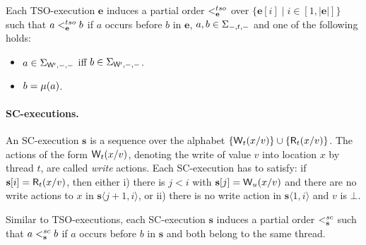 Each TSO-execution $\mathbf{e}$ induces a partial order $<^{tso}_{\mathbf{e}}$ over $\{\mathbf{e}[i] \mid i\in[1,|\mathbf{e}|]\}$ such that $a<^{tso}_{\mathbf{e}} b$ if $a$ occurs before $b$ in $\mathbf{e}$, $a,b\in\Sigma_{-,t,-}$ and one of the following holds:
\begin{itemize}
\item $a\in\Sigma_{\mathsf{W}^{\mathsf{r}},-,-}$ iff $b\in\Sigma_{\mathsf{W}^{\mathsf{r}},-,-}$.
\item $b=\mu(a)$.
\end{itemize}

\paragraph{SC-executions.}
An SC-execution $\mathbf{s}$ is a sequence over the alphabet $\{\mathsf{W}_{t}(x/v)\}\cup\{\mathsf{R}_{t}(x/v)\}$.
The actions of the form $\mathsf{W}_{t}(x/v)$, denoting the write of value $v$ into location $x$ by thread $t$, are called {\em write} actions.
Each SC-execution has to satisfy: if $\mathbf{s}[i]=\mathsf{R}_{t}(x/v)$, then either i) there is $j<i$ with $\mathbf{s}[j]=\mathsf{W}_{u}(x/v)$ and there are no write actions to $x$ in $\mathbf{s}\langle j+1,i\rangle$, or ii) there is no write action in $\mathbf{s}\langle 1,i\rangle$ and $v$ is $\bot$.

Similar to TSO-executions, each SC-execution $\mathbf{s}$ induces a partial order $<^{sc}_{\mathbf{s}}$ such that $a<^{sc}_{\mathbf{s}} b$ if $a$ occurs before $b$ in $\mathbf{s}$ and both belong to the same thread.

\newcommand{\SCofTSO}{\ensuremath{\mathsf{SC}}}
\newcommand{\SCofTSOx}[1]{\ensuremath{\SCofTSO(#1)}}
\newcommand{\SCofTSOstrict}{\ensuremath{\SCofTSO_S}}
\newcommand{\SCofTSOstrictx}[1]{\ensuremath{\SCofTSOstrict(#1)}}
\newcommand{\aliconvert}{\ensuremath{\ulcorner \urcorner}}
\newcommand{\aliconvertx}[1]{\ensuremath{\ulcorner #1 \urcorner}}
\newcommand{\tsoequiv}{\ensuremath{\approx}}
\newcommand{\tsoequivstrict}{\ensuremath{\tsoequiv_S}}
\newcommand{\equivclassx}[2]{\ensuremath{[#1]_{#2}}}
\newcommand{\tighter}{\ensuremath{\sqsubseteq}}
\newcommand{\tighterstrict}{\ensuremath{\tighter_S}}
\newcommand{\tightclosure}{\ensuremath{\mathsf{T}}}
\newcommand{\tightclosurex}[1]{\ensuremath{\tightclosure(#1)}}
\newcommand{\tightclosurestrict}{\ensuremath{\tightclosure_S}}
\newcommand{\tightclosurestrictx}[1]{\ensuremath{\tightclosurestrict(#1)}}

